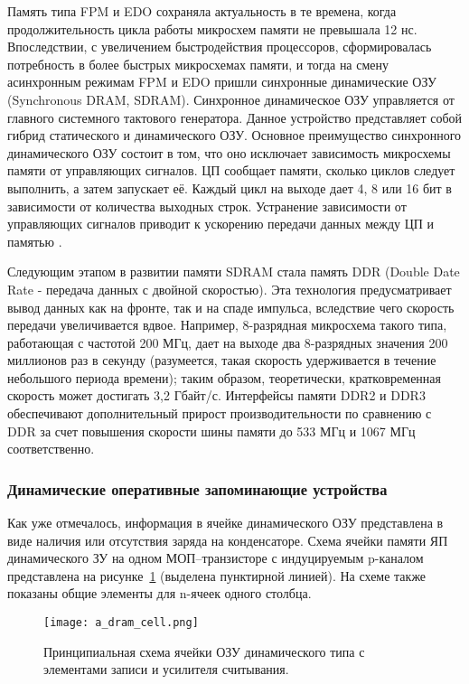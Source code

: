 Память типа FPM и EDO сохраняла актуальность в те времена, когда продолжительность цикла работы микросхем памяти не превышала 12 нс. Впоследствии, с увеличением быстродействия процессоров, сформировалась потребность в более быстрых микросхемах памяти, и тогда на смену асинхронным режимам FPM и EDO пришли синхронные динамические ОЗУ (Synchronous DRAM, SDRAM). Синхронное динамическое ОЗУ управляется от главного системного тактового генератора. Данное устройство представляет собой гибрид статического и динамического ОЗУ. Основное преимущество синхронного динамического ОЗУ состоит в том, что оно исключает зависимость микросхемы памяти от управляющих сигналов. ЦП сообщает памяти, сколько циклов следует выполнить, а затем запускает её. Каждый цикл на выходе дает 4, 8 или 16 бит в зависимости от количества выходных строк. Устранение зависимости от управляющих сигналов приводит к ускорению передачи данных между ЦП и памятью \cite{ibm_dram_article}.

Следующим этапом в развитии памяти SDRAM стала память DDR (Double Date Rate - передача данных с двойной скоростью). Эта технология предусматривает вывод данных как на фронте, так и на спаде импульса, вследствие чего скорость передачи увеличивается вдвое. Например, 8-разрядная микросхема такого типа, работающая с частотой 200 МГц, дает на выходе два 8-разрядных значения 200 миллионов раз в секунду (разумеется, такая скорость удерживается в течение небольшого периода времени); таким образом, теоретически, кратковременная скорость может достигать 3,2 Гбайт/с. Интерфейсы памяти DDR2 и DDR3 обеспечивают дополнительный прирост производительности по сравнению с DDR за счет повышения скорости шины памяти до 533 МГц и 1067 МГц соответственно.

\subsubsection{Динамические оперативные запоминающие устройства}
\label{sub:domain:ram:dram}
Как уже отмечалось, информация в ячейке динамического ОЗУ представлена в виде наличия или отсутствия заряда на конденсаторе. Схема ячейки памяти ЯП динамического ЗУ на одном МОП–транзисторе с индуцируемым p-каналом представлена на рисунке~\ref{fig:domain:ram:dram:dram_cell} (выделена пунктирной линией). На схеме также показаны общие элементы для n-ячеек одного столбца. 


\begin{figure}[ht]
\centering
  \texttt{[image: a\_dram\_cell.png]}  
  \caption{ Принципиальная схема ячейки ОЗУ динамического типа с элементами записи и усилителя считывания. }
  \label{fig:domain:ram:dram:dram_cell}
\end{figure}

